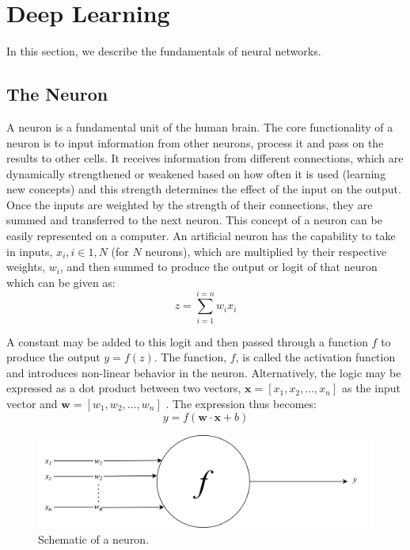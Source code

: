 \section{Deep Learning}
In this section, we describe the fundamentals of neural networks.

\subsection{The Neuron}
A neuron is a fundamental unit of the human brain. The core functionality of a neuron is to input information from other neurons, process it and pass on the results to other cells. It receives information from different connections, which are dynamically strengthened or weakened based on how often it is used (learning new concepts) and this strength determines the effect of the input on the output. Once the inputs are weighted by the strength of their connections, they are summed and transferred to the next neuron. This concept of a neuron can be easily represented on a computer. An artificial neuron has the capability to take in inputs, $x_i, i \in 1,N$ (for $N$ neurons), which are multiplied by their respective weights, $w_i$, and then summed to produce the output or logit of that neuron which can be given as: 
\begin{equation}
z = \sum_{i=1}^{i=n} w_ix_i
\end{equation}

A constant may be added to this logit and then passed through a function $f$ to produce the output $y = f(z)$. The function, $f$, is called the activation function and introduces non-linear behavior in the neuron. Alternatively, the logic may be expressed as a dot product between two vectors, $\boldsymbol{x} = [x_1, x_2,...,x_n]$ as the input vector and $\boldsymbol{w} = [w_1, w_2,...,w_n]$ \cite{buduma2017fundamentals}. The expression thus becomes:
\begin{equation}
y = f(\boldsymbol{w}\cdot\boldsymbol{x} + b)
\end{equation}

\begin{figure}[!h]
	\centering
	\includegraphics[width=1.0\textwidth]{Pictures/hdnnfin.png}
	\hspace{1mm}
	\caption{Schematic of a neuron.} 
	\label{fig:neuron}
\end{figure}

